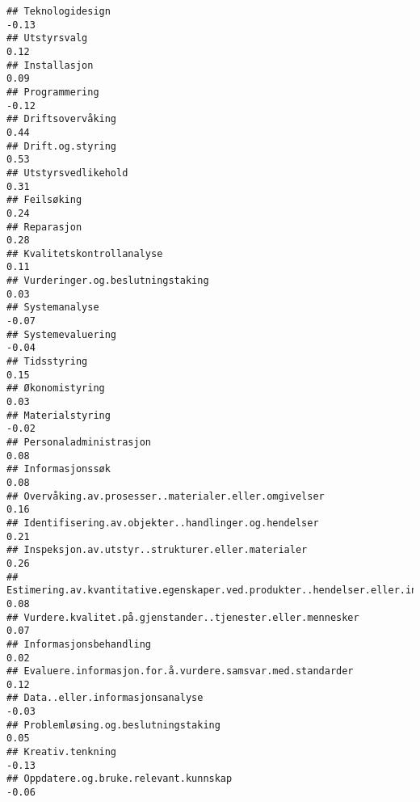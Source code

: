 \documentclass[
]{article}
\begin{document}
\begin{verbatim}
## Teknologidesign                                                                  -0.13
## Utstyrsvalg                                                                       0.12
## Installasjon                                                                      0.09
## Programmering                                                                    -0.12
## Driftsovervåking                                                                  0.44
## Drift.og.styring                                                                  0.53
## Utstyrsvedlikehold                                                                0.31
## Feilsøking                                                                        0.24
## Reparasjon                                                                        0.28
## Kvalitetskontrollanalyse                                                          0.11
## Vurderinger.og.beslutningstaking                                                  0.03
## Systemanalyse                                                                    -0.07
## Systemevaluering                                                                 -0.04
## Tidsstyring                                                                       0.15
## Økonomistyring                                                                    0.03
## Materialstyring                                                                  -0.02
## Personaladministrasjon                                                            0.08
## Informasjonssøk                                                                   0.08
## Overvåking.av.prosesser..materialer.eller.omgivelser                              0.16
## Identifisering.av.objekter..handlinger.og.hendelser                               0.21
## Inspeksjon.av.utstyr..strukturer.eller.materialer                                 0.26
## Estimering.av.kvantitative.egenskaper.ved.produkter..hendelser.eller.informasjon  0.08
## Vurdere.kvalitet.på.gjenstander..tjenester.eller.mennesker                        0.07
## Informasjonsbehandling                                                            0.02
## Evaluere.informasjon.for.å.vurdere.samsvar.med.standarder                         0.12
## Data..eller.informasjonsanalyse                                                  -0.03
## Problemløsing.og.beslutningstaking                                                0.05
## Kreativ.tenkning                                                                 -0.13
## Oppdatere.og.bruke.relevant.kunnskap                                             -0.06

\end{verbatim}
\end{document}
